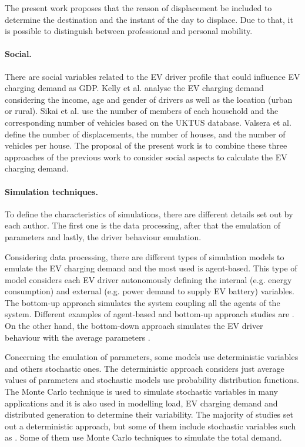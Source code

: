 \documentclass[a4paper,11pt,twoside,openright]{report}
\begin{document}
The present work proposes that the reason of displacement be included to determine the destination and the instant of the day to displace. Due to that, it is possible to distinguish between professional and personal mobility.

\paragraph{Social.}
There are social variables related to the EV driver profile that could influence EV charging demand as GDP. Kelly et al. \cite{Kelly2012} analyse the EV charging demand considering the income, age and gender of drivers as well as the location (urban or rural). Sikai et al. \cite{Sikai2009} use the number of members of each household and the corresponding number of vehicles based on the UKTUS database. Valsera et al. \cite{Valsera2012} define the number of displacements, the number of houses, and the number of vehicles per house. The proposal of the present work is to combine these three approaches of the previous work to consider social aspects to calculate the EV charging demand.

\paragraph{Simulation techniques.}
To define the characteristics of simulations, there are different details set out by each author. The first one is the data processing, after that the emulation of parameters and lastly, the driver behaviour emulation.

Considering data processing, there are different types of simulation models to emulate the EV charging demand and the most used is agent-based. This type of model considers each EV driver autonomously defining the internal (e.g. energy consumption) and external (e.g. power demand to supply EV battery) variables. The bottom-up approach simulates the system coupling all the agents of the system. Different examples of agent-based and bottom-up approach studies are \cite{Stephens_Michigan_2010,Waraich_ETH,Galus2008}. On the other hand, the bottom-down approach simulates the EV driver behaviour with the average parameters \cite{Valsera2011,MaitraCIRED2009}.

Concerning the emulation of parameters, some models use deterministic variables and others stochastic ones. The deterministic approach considers just average values of parameters and stochastic models use probability distribution functions. The Monte Carlo technique is used to simulate stochastic variables in many applications and it is also used in modelling load, EV charging demand and distributed generation to determine their variability. The majority of studies set out a deterministic approach, but some of them include stochastic variables such as \cite{Sikai2010,Valsera2011,FactorAnalysisQinglai,Lojowska2011,Sikai2009,Sikai2011,Loisel2014}. Some of them use Monte Carlo techniques to simulate the total demand.
\end{document}
